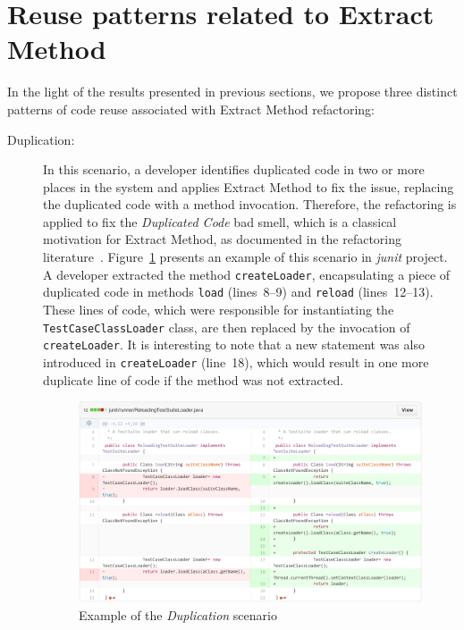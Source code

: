 \section{Reuse patterns related to Extract Method}
\label{reusepatterns}



In the light of the results presented in previous sections, we propose three distinct patterns of code reuse associated with Extract Method refactoring:
\begin{description}
\item[Duplication:] In this scenario, a developer identifies duplicated code in two or more places in the system and applies Extract Method to fix the issue, replacing the duplicated code with a method invocation.
Therefore, the refactoring is applied to fix the \emph{Duplicated Code} bad smell, which is a classical motivation for Extract Method, as documented in the refactoring literature~\citep{Fowler:1999}.
Figure~\ref{iexdup} presents an example of this scenario in \textit{junit} project. A developer extracted the method \texttt{createLoader}, encapsulating a piece of duplicated code in methods \texttt{load} (lines~8--9) and \texttt{reload} (lines~12--13).
These lines of code, which were responsible for instantiating the \texttt{TestCaseClassLoader} class, are then replaced by the invocation of \texttt{createLoader}. It is interesting to note that a new statement was also introduced in \texttt{createLoader} (line~18), which would result in one more duplicate line of code if the method was not extracted.

\begin{figure}[htbp]\centering
\includegraphics[width=1\textwidth]{img/ch5/dup.pdf}
\caption{Example of the \textit{Duplication} scenario}
\label{iexdup}
\end{figure}  



\end{description}
